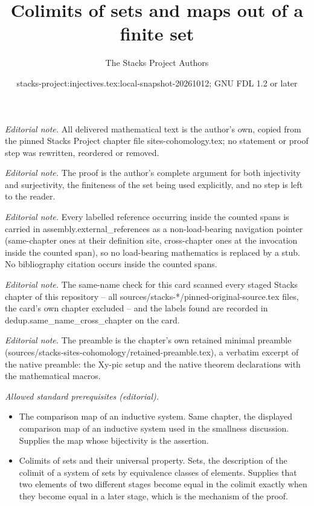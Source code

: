 \documentclass[10pt,a4paper]{amsart}
\title{Colimits of sets and maps out of a finite set}
\author{The Stacks Project Authors}
\date{stacks-project:injectives.tex:local-snapshot-20261012; GNU FDL 1.2 or later}
\theoremstyle{plain}
\theoremstyle{definition}
\theoremstyle{remark}
\numberwithin{equation}{subsection}
\begin{document}
\maketitle
\noindent\textit{Editorial note.} All delivered mathematical text is the author's own, copied from the pinned Stacks Project chapter file sites-cohomology.tex; no statement or proof step was rewritten, reordered or removed.\par\medskip
\noindent\textit{Editorial note.} The proof is the author's complete argument for both injectivity and surjectivity, the finiteness of the set being used explicitly, and no step is left to the reader.\par\medskip
\noindent\textit{Editorial note.} Every labelled reference occurring inside the counted spans is carried in assembly.external\_references as a non-load-bearing navigation pointer (same-chapter ones at their definition site, cross-chapter ones at the invocation inside the counted span), so no load-bearing mathematics is replaced by a stub. No bibliography citation occurs inside the counted spans.\par\medskip
\noindent\textit{Editorial note.} The same-name check for this card scanned every staged Stacks chapter of this repository -- all sources/stacks-*/pinned-original-source.tex files, the card's own chapter excluded -- and the labels found are recorded in dedup.same\_name\_cross\_chapter on the card.\par\medskip
\noindent\textit{Editorial note.} The preamble is the chapter's own retained minimal preamble (sources/stacks-sites-cohomology/retained-preamble.tex), a verbatim excerpt of the native preamble: the Xy-pic setup and the native theorem declarations with the mathematical macros.\par\medskip
\noindent\textit{Allowed standard prerequisites (editorial).}\begin{itemize}
\item The comparison map of an inductive system. Same chapter, the displayed comparison map of an inductive system used in the smallness discussion. Supplies the map whose bijectivity is the assertion.
\item Colimits of sets and their universal property. Sets, the description of the colimit of a system of sets by equivalence classes of elements. Supplies that two elements of two different stages become equal in the colimit exactly when they become equal in a later stage, which is the mechanism of the proof.
\end{itemize}\medskip
\end{document}
